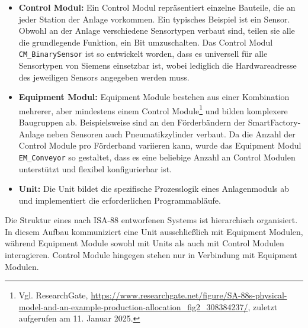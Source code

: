 \sloppy
\begin{itemize}
    \item \textbf{Control Modul:} Ein Control Modul repräsentiert einzelne Bauteile, die an jeder Station der Anlage
    vorkommen. Ein typisches Beispiel ist ein Sensor. Obwohl an der Anlage verschiedene Sensortypen verbaut sind, teilen 
    sie alle die grundlegende Funktion, ein Bit umzuschalten. Das Control Modul \texttt{CM\_BinarySensor} ist so entwickelt 
    worden, dass es universell für alle Sensortypen von Siemens einsetzbar ist, wobei lediglich die Hardwareadresse des jeweiligen 
    Sensors angegeben werden muss.

    \item \textbf{Equipment Modul:} Equipment Module bestehen aus einer Kombination mehrerer, aber mindestens einem Control Module\footnote{Vgl. ResearchGate, \url{https://www.researchgate.net/figure/SA-88s-physical-model-and-an-example-production-allocation_fig2_308384237/}, zuletzt aufgerufen am 11. Januar 2025.}
    und bilden komplexere Baugruppen ab. Beispielsweise sind an den Förderbändern der SmartFactory-Anlage neben Sensoren auch 
    Pneumatikzylinder verbaut. Da die Anzahl der Control Module pro Förderband variieren kann, wurde das Equipment Modul 
    \texttt{EM\_Conveyor} so gestaltet, dass es eine beliebige Anzahl an Control Modulen unterstützt und flexibel 
    konfigurierbar ist.

    \item \textbf{Unit:} Die Unit bildet die spezifische Prozesslogik eines Anlagenmoduls ab und implementiert die 
    erforderlichen Programmabläufe.
\end{itemize}

Die Struktur eines nach ISA-88 entworfenen Systems ist hierarchisch organisiert. In diesem Aufbau kommuniziert eine Unit 
ausschließlich mit Equipment Modulen, während Equipment Module sowohl mit Units als auch mit Control Modulen interagieren. 
Control Module hingegen stehen nur in Verbindung mit Equipment Modulen.
